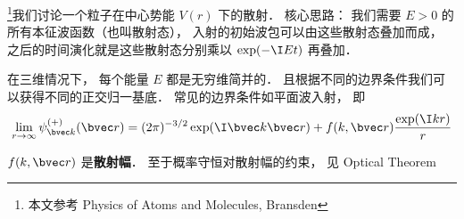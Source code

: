 
\footnote{本文参考 Physics of Atoms and Molecules, Bransden}我们讨论一个粒子在中心势能 $V(r)$ 下的散射． 核心思路： 我们需要 $E > 0$ 的所有本征波函数（也叫散射态）， 入射的初始波包可以由这些散射态叠加而成， 之后的时间演化就是这些散射态分别乘以 $\exp(-\I E t)$ 再叠加．

在三维情况下， 每个能量 $E$ 都是无穷维简并的． 且根据不同的边界条件我们可以获得不同的正交归一基底． 常见的边界条件如平面波入射， 即
\begin{equation}
\lim_{r \to \infty} \psi_{\bvec k}^{(+)}(\bvec r) = (2\pi)^{-3/2} \exp(\I \bvec k\bvec r) + f(k, \bvec r) \frac{\exp(\I k r)}{r}
\end{equation}

$f(k, \bvec r)$ 是\textbf{散射幅}． 至于概率守恒对散射幅的约束， 见 Optical Theorem


